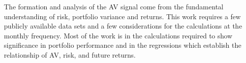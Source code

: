 The formation and analysis of the AV signal come from the fundamental understanding of risk, portfolio variance and returns. This work requires a few publicly available data sets and a few considerations for the calculations at the monthly frequency. Most of the work is in the calculations required to show significance in portfolio performance and in the regressions which establish the relationship of AV, risk, and future returns.

